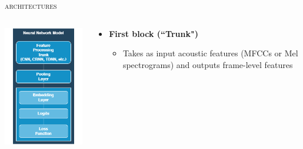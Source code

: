 \documentclass[10pt,aspectratio=1610,professionalfont]{beamer}
\begin{document}
\begin{frame}{\textsc{architectures}}
	\begin{columns}
		\begin{column}{0.3\textwidth}
		   	\begin{center}
		     	\includegraphics[width=1.1\textwidth]{img/architecture.png}
		    	\end{center}
		\end{column}
		\begin{column}{0.5\textwidth}  %
			\begin{itemize}
		        \item \textbf{First block (``Trunk")}
		        \begin{itemize}
		            	\item Takes as input acoustic features (MFCCs or Mel spectrograms) and outputs frame-level features

\end{itemize}
\end{itemize}
\end{column}
\end{columns}
\end{frame}
\end{document}
